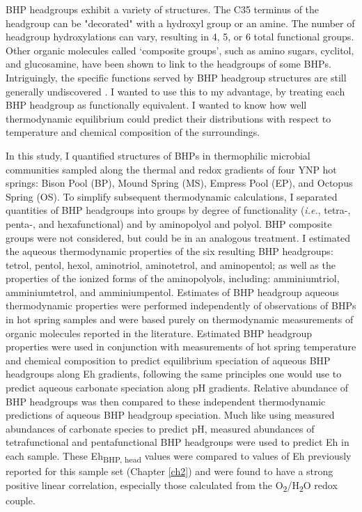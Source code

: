 BHP headgroups exhibit a variety of structures. The C35 terminus of the headgroup can be "decorated" with a hydroxyl group or an amine. The number of headgroup hydroxylations can vary, resulting in 4, 5, or 6 total functional groups. Other organic molecules called `composite groups', such as amino sugars, cyclitol, and glucosamine, have been shown to link to the headgroups of some BHPs. Intriguingly, the specific functions served by BHP headgroup structures are still generally undiscovered \citep{belin2018hopanoid}. I wanted to use this to my advantage, by treating each BHP headgroup as functionally equivalent. I wanted to know how well thermodynamic equilibrium could predict their distributions with respect to temperature and chemical composition of the surroundings.

In this study, I quantified structures of BHPs in thermophilic microbial communities sampled along the thermal and redox gradients of four YNP hot springs: Bison Pool (BP), Mound Spring (MS), Empress Pool (EP), and Octopus Spring (OS). To simplify subsequent thermodynamic calculations, I separated quantities of BHP headgroups into groups by degree of functionality (\textit{i.e.}, tetra-, penta-, and hexafunctional) and by aminopolyol and polyol. BHP composite groups were not considered, but could be in an analogous treatment. I estimated the aqueous thermodynamic properties of the six resulting BHP headgroups: tetrol, pentol, hexol, aminotriol, aminotetrol, and aminopentol; as well as the properties of the ionized forms of the aminopolyols, including: amminiumtriol, amminiumtetrol, and amminiumpentol. Estimates of BHP headgroup aqueous thermodynamic properties were performed independently of observations of BHPs in hot spring samples and were based purely on thermodynamic measurements of organic molecules reported in the literature. Estimated BHP headgroup properties were used in conjunction with measurements of hot spring temperature and chemical composition to predict equilibrium speciation of aqueous BHP headgroups along Eh gradients, following the same principles one would use to predict aqueous carbonate speciation along pH gradients. Relative abundance of BHP headgroups was then compared to these independent thermodynamic predictions of aqueous BHP headgroup speciation. Much like using measured abundances of carbonate species to predict pH, measured abundances of tetrafunctional and pentafunctional BHP headgroups were used to predict Eh in each sample. These Eh\textsubscript{BHP, head} values were compared to values of Eh previously reported for this sample set (Chapter \ref{ch2}) and were found to have a strong positive linear correlation, especially those calculated from the O\textsubscript{2}/H\textsubscript{2}O redox couple.

